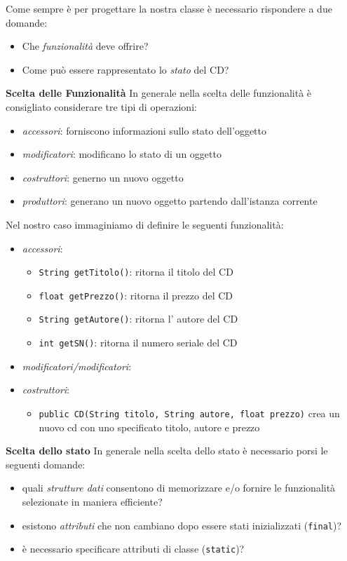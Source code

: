 \documentclass{article}
\begin{document}
Come sempre \`e per progettare la nostra classe \`e necessario rispondere a due domande:
\begin{itemize}
\item Che \emph{funzionalità} deve offrire?
\item Come può essere rappresentato lo \emph{stato} del CD?
\end{itemize}



\textbf{Scelta delle Funzionalit\`a}
In generale nella scelta delle funzionalit\`a \`e consigliato considerare tre tipi di operazioni:
\begin{itemize}
\item \emph{accessori}: forniscono informazioni sullo stato dell'oggetto
\item \emph{modificatori}: modificano lo stato di un oggetto
\item \emph{costruttori}: generno un nuovo oggetto
\item \emph{produttori}: generano un nuovo oggetto partendo dall'istanza corrente
\end{itemize}

Nel nostro caso immaginiamo di definire le seguenti funzionalit\`a:
\begin{itemize}
\item \emph{accessori}:
\begin{itemize}
\item \texttt{String getTitolo()}: ritorna il titolo del CD
\item \texttt{float getPrezzo()}: ritorna il prezzo del CD
\item \texttt{String getAutore()}: ritorna l' autore del CD
\item \texttt{int getSN()}: ritorna il numero seriale del CD
\end{itemize}
\item \emph{modificatori/modificatori}:
\item \emph{costruttori}:
\begin{itemize}
\item \texttt{public CD(String titolo, String autore, float prezzo)} crea un nuovo cd con uno specificato titolo, autore e prezzo
\end{itemize}
\end{itemize}


\textbf{Scelta dello stato}
In generale nella scelta dello stato \`e necessario porsi le seguenti domande:
\begin{itemize}
\item quali \emph{strutture dati} consentono di memorizzare e/o fornire le funzionalit\`a selezionate in maniera efficiente?
\item esistono \emph{attributi} che non cambiano dopo essere stati inizializzati (\texttt{final})?
\item \`e necessario specificare attributi di classe (\texttt{static})?
\end{itemize}
\end{document}
